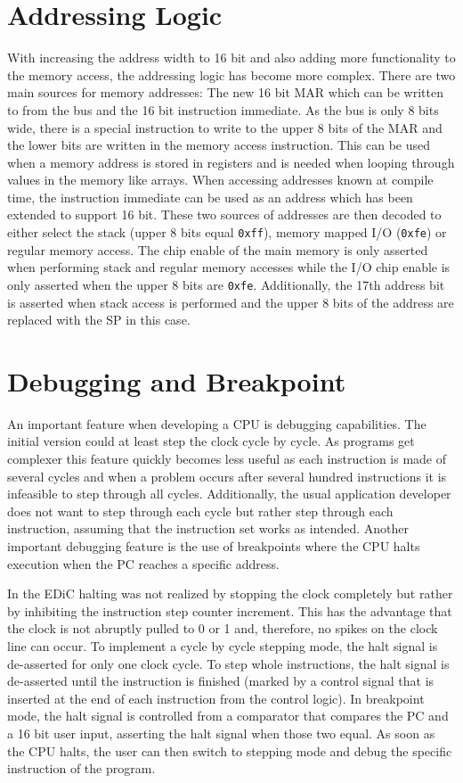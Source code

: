 \section{Addressing Logic}\label{sec:addrLogic}
With increasing the address width to 16 bit and also adding more functionality to the memory access, the addressing logic has become more complex.
There are two main sources for memory addresses: The new 16 bit \gls{MAR} which can be written to from the bus and the 16 bit instruction immediate.
As the bus is only 8 bits wide, there is a special instruction to write to the upper 8 bits of the \gls{MAR} and the lower bits are written in the memory access instruction.
This can be used when a memory address is stored in registers and is needed when looping through values in the memory like arrays.
When accessing addresses known at compile time, the instruction immediate can be used as an address which has been extended to support 16 bit.
These two sources of addresses are then decoded to either select the stack (upper 8 bits equal \texttt{0xff}), memory mapped I/O (\texttt{0xfe}) or regular memory access.
The chip enable of the main memory is only asserted when performing stack and regular memory accesses while the I/O chip enable is only asserted when the upper 8 bits are \texttt{0xfe}.
Additionally, the 17th address bit is asserted when stack access is performed and the upper 8 bits of the address are replaced with the \gls{SP} in this case.

\section{Debugging and Breakpoint}
An important feature when developing a \gls{CPU} is debugging capabilities.
The initial version could at least step the clock cycle by cycle.
As programs get complexer this feature quickly becomes less useful as each instruction is made of several cycles and when a problem occurs after several hundred instructions it is infeasible to step through all cycles.
Additionally, the usual application developer does not want to step through each cycle but rather step through each instruction, assuming that the instruction set works as intended.
Another important debugging feature is the use of breakpoints where the \gls{CPU} halts execution when the \gls{PC} reaches a specific address.

In the \gls{EDiC} halting was not realized by stopping the clock completely but rather by inhibiting the instruction step counter increment.
This has the advantage that the clock is not abruptly pulled to 0 or 1 and, therefore, no spikes on the clock line can occur.
To implement a cycle by cycle stepping mode, the halt signal is de-asserted for only one clock cycle.
To step whole instructions, the halt signal is de-asserted until the instruction is finished (marked by a control signal that is inserted at the end of each instruction from the control logic).
In breakpoint mode, the halt signal is controlled from a comparator that compares the \gls{PC} and a 16 bit user input, asserting the halt signal when those two equal.
As soon as the \gls{CPU} halts, the user can then switch to stepping mode and debug the specific instruction of the program.

